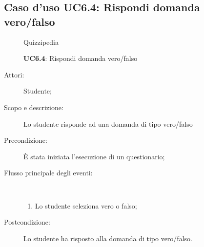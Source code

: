 \subsection{Caso d'uso UC6.4: Rispondi domanda vero/falso}
	\begin{figure}[H]
		\centering
		\begin{resizedtikzpicture}{\textwidth}
		\begin{umlsystem}[x=0, fill=lightgray!20]{Quizzipedia}
		\end{umlsystem}
		\end{resizedtikzpicture}
		\caption{\textbf{UC6.4}: Rispondi domanda vero/falso}
		\label{UC6.4}
	\end{figure}
\begin{description}
\item[Attori:] Studente;
\item[Scopo e descrizione:] Lo studente risponde ad una domanda di tipo vero/falso
      \item[Precondizione:] È stata iniziata l'esecuzione di un questionario;

        \item[Flusso principale degli eventi:] \ 
 \begin{enumerate}
          \item Lo studente seleziona vero o falso;

      \end{enumerate}
    \item[Postcondizione:] Lo studente ha risposto alla domanda di tipo vero/falso.
  \end{description}
\hypertarget{UC6.5}{}
